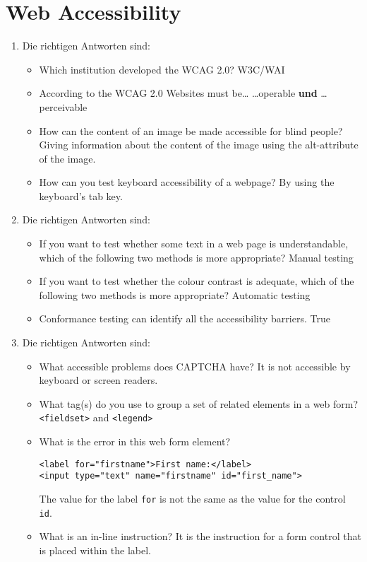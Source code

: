 \documentclass{article}
\begin{document}
	\section*{Web Accessibility}
	\begin{enumerate}[label=(\alph*)]
		\item Die richtigen Antworten sind:
		\begin{itemize}
			\item Which institution developed the WCAG 2.0? \textcolor{green!90!black}{W3C/WAI}
			\item According to the WCAG 2.0 Websites must be… \textcolor{green!90!black}{…operable} \textbf{und} \textcolor{green!90!black}{…perceivable}
			\item How can the content of an image be made accessible for blind people? \textcolor{green!90!black}{Giving information about the content of the image using the alt-attribute of the image.}
			\item How can you test keyboard accessibility of a webpage? \textcolor{green!90!black}{By using the keyboard's tab key.}
		\end{itemize}
		\item Die richtigen Antworten sind:
		\begin{itemize}
			\item If you want to test whether some text in a web page is understandable, which of the following two methods is more appropriate? \textcolor{green!90!black}{Manual testing}
			\item If you want to test whether the colour contrast is adequate, which of the following two methods is more appropriate? \textcolor{green!90!black}{Automatic testing}
			\item Conformance testing can identify all the accessibility barriers. \textcolor{green!90!black}{True}
		\end{itemize}
		\item Die richtigen Antworten sind:
		\begin{itemize}
			\item What accessible problems does CAPTCHA have? \textcolor{green!90!black}{It is not accessible by keyboard or screen readers.}
			\item What tag(s) do you use to group a set of related elements in a web form? \textcolor{green!90!black}{\texttt{<fieldset>} and \texttt{<legend>}}
			\item What is the error in this web form element?
			\begin{lstlisting}[style=html]
<label for="firstname">First name:</label>
<input type="text" name="firstname" id="first_name">
			\end{lstlisting}
			\textcolor{green!90!black}{The value for the label \texttt{for} is not the same as the value for the control \texttt{id}.}
			\item What is an in-line instruction? \textcolor{green!90!black}{It is the instruction for a form control that is placed within the label.}
		\end{itemize}
	\end{enumerate}
\end{document}
